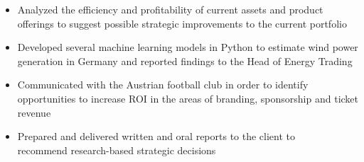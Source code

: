 \documentclass[9pt,a4paper,ragged2e]{altacv}
\begin{document}
    \begin{itemize}
        \item Analyzed the efficiency and profitability of current assets and product offerings to suggest possible strategic improvements to the current portfolio
        \item Developed several machine learning models in Python to estimate wind power generation in Germany and reported findings to the Head of Energy Trading
    \end{itemize}

    \divider

    \begin{itemize}
        \item Communicated with the Austrian football club in order to identify opportunities to increase ROI in the areas of branding, sponsorship and ticket revenue
        \item Prepared and delivered written and oral reports to the client to \\ recommend research-based strategic decisions
    \end{itemize}



    \bigskip\bigskip\bigskip


    \clearpage
\end{document}
